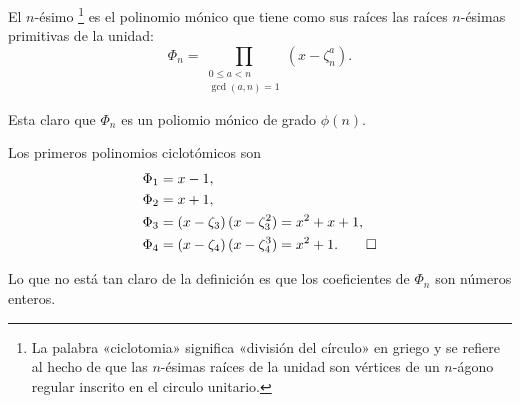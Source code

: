\begin{definicion}
  El $n$-ésimo \footnote{La palabra «ciclotomia»
    significa «división del círculo» en griego y se refiere al hecho de que
    las $n$-ésimas raíces de la unidad son vértices de un $n$-ágono regular
    inscrito en el circulo unitario.} es el polinomio mónico que tiene como sus
  raíces las raíces $n$-ésimas primitivas de la unidad:
  $$\Phi_n = \prod_{\substack{0 \le a < n \\ \gcd (a,n) = 1}} (x - \zeta_n^a).$$
\end{definicion}

Esta claro que $\Phi_n$ es un poliomio mónico de grado $\phi (n)$.

\begin{ejemplo}
  Los primeros polinomios ciclotómicos son
  \begin{align*}
    \Phi_1 & = x - 1,\\
    \Phi_2 & = x + 1,\\
    \Phi_3 & = (x - \zeta_3)\,(x - \zeta_3^2) = x^2 + x + 1,\\
    \Phi_4 & = (x - \zeta_4)\,(x - \zeta_4^3) = x^2 + 1. \qedhere
  \end{align*}
\end{ejemplo}

Lo que no está tan claro de la definición es que los coeficientes de $\Phi_n$
son números enteros.

